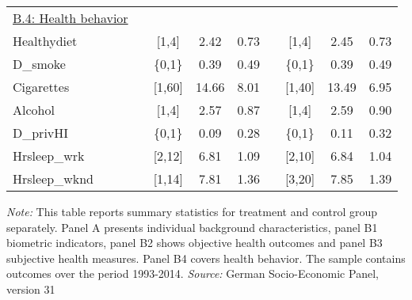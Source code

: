 \begin{center}
\begin{longtable}{l*{8}{c}}
\\	%
\underline{B.4: Health behavior}\\
Healthydiet & & [1,4] & 2.42 &0.73 &  & [1,4] & 2.45 &0.73 \\ 
D\_smoke & & \{0,1\} &0.39 &0.49 &  & \{0,1\} &0.39 &0.49 \\ 
Cigarettes & & [1,60] & 14.66 & 8.01 &  & [1,40] & 13.49 & 6.95 \\ 
Alcohol & & [1,4] & 2.57 &0.87 &  & [1,4] & 2.59 &0.90 \\ 
D\_privHI & & \{0,1\} &0.09 &0.28 &  & \{0,1\} &0.11 &0.32 \\ 
Hrsleep\_wrk & & [2,12] & 6.81 & 1.09 &  & [2,10] & 6.84 & 1.04 \\ 
Hrsleep\_wknd & & [1,14] & 7.81 & 1.36 &  & [3,20] & 7.85 & 1.39 \\ 

\end{longtable}
\end{center}
\vspace{-1cm}\hspace{-2.3 cm}
\begin{minipage}{1.1\textwidth} %
{\footnotesize \textit{Note:} This table reports summary statistics for treatment and control group separately. Panel A presents individual background characteristics, panel B1 biometric indicators, panel B2 shows objective health outcomes and panel B3 subjective health measures. Panel B4 covers health behavior. The sample contains outcomes over the period 1993-2014.  \newline \textit{Source: }German Socio-Economic Panel, version 31\par}
\end{minipage}
